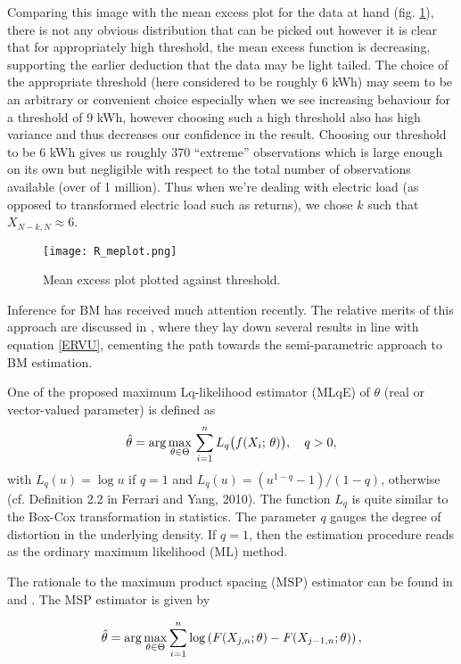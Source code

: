 Comparing this image with the mean excess plot for the data at hand (fig. \ref{fig:r_me}), there is not any obvious distribution that can be picked out however it is clear that for appropriately high threshold, the mean excess function is decreasing, supporting the earlier deduction that the data may be light tailed. The choice of the appropriate threshold (here considered to be roughly 6 kWh) may seem to be an arbitrary or convenient choice especially when we see increasing behaviour for a threshold of 9 kWh, however choosing such a high threshold also has high variance and thus decreases our confidence in the result. Choosing our threshold to be 6 kWh gives us roughly 370 ``extreme'' observations which is large enough on its own but negligible with respect to the total number of observations available (over of 1 million). Thus when we're dealing with electric load (as opposed to transformed electric load such as returns), we chose $k$ such that $X_{N-k,N} \approx 6$.

\begin{figure}
\centering
\texttt{[image: R\_meplot.png]}
\caption{\label{fig:r_me} Mean excess plot plotted against threshold.}
\end{figure}


Inference for BM has received much attention recently. The relative merits of this approach are discussed in \cite{FdeH:15}, where they lay down several results in line with equation \ref{ERVU}, cementing the path towards the semi-parametric approach to BM estimation.

One of the proposed maximum Lq-likelihood estimator (MLqE) of $\theta$ (real or vector-valued parameter) is defined as
\begin{equation*}
	\hat{\theta}= \displaystyle {\arg\max_{\theta \in \Theta}} \, \sum\limits_{i=1}^{n} L_q\bigl( f(X_i; \, \theta)\bigr), \quad q>0,
\end{equation*}
with $L_q(u)= \log u$ if $q=1$ and $L_q(u)= (u^{1-q}- 1)/(1-q)$, otherwise (cf. Definition 2.2 in Ferrari and Yang, 2010). The function $L_q$ is quite similar to the Box-Cox transformation in statistics. The parameter $q$ gauges the degree of distortion in the underlying density. If $q=1$, then the estimation procedure reads as the ordinary maximum likelihood (ML) method.

The rationale to the maximum product spacing (MSP) estimator can be found in \cite{ChengAmin:79} and \cite{Ranneby:84}. The MSP estimator is given by

\begin{equation*}
\hat{\theta} = \displaystyle {\arg\max_{\theta \in \Theta}} \sum\limits_{i=1}^{n} \log \left( F(X_{j,n};\theta) - F(X_{j-1,n};\theta) \right),
\end{equation*}

